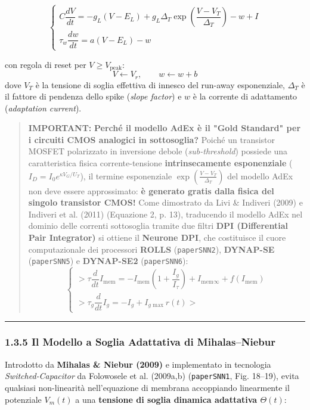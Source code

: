 \documentclass[11pt,a4paper]{article}
\begin{document}
\[
\begin{cases}
C \dfrac{dV}{dt} = -g_L (V - E_L) + g_L \Delta_T \exp\left(\dfrac{V - V_T}{\Delta_T}\right) - w + I \\
\tau_w \dfrac{dw}{dt} = a(V - E_L) - w
\end{cases}
\]

con regola di reset per $V \ge V_{\text{peak}}$:
\[
V \leftarrow V_r, \qquad w \leftarrow w + b
\]
dove $V_T$ è la tensione di soglia effettiva di innesco del run-away esponenziale, $\Delta_T$ è il fattore di pendenza dello spike (\textit{slope factor}) e $w$ è la corrente di adattamento (\textit{adaptation current}).

\begin{quote}
\textbf{IMPORTANT:} \textbf{Perché il modello AdEx è il "Gold Standard" per i circuiti CMOS analogici in sottosoglia?}
Poiché un transistor MOSFET polarizzato in inversione debole (\textit{sub-threshold}) possiede una caratteristica fisica corrente-tensione \textbf{intrinsecamente esponenziale} ($I_D = I_0 e^{\kappa V_G / U_T}$), il termine esponenziale $\exp\left(\frac{V - V_T}{\Delta_T}\right)$ del modello AdEx non deve essere approssimato: \textbf{è generato gratis dalla fisica del singolo transistor CMOS!} Come dimostrato da Livi \& Indiveri (2009) e Indiveri et al. (2011) (Equazione 2, p. 13), traducendo il modello AdEx nel dominio delle correnti sottosoglia tramite due filtri \textbf{DPI (Differential Pair Integrator)} si ottiene il \textbf{Neurone DPI}, che costituisce il cuore computazionale dei processori \textbf{ROLLS} (\texttt{paperSNN2}), \textbf{DYNAP-SE} (\texttt{paperSNN5}) e \textbf{DYNAP-SE2} (\texttt{paperSNN6}):
\[
\begin{cases}
> \tau \dfrac{d}{dt} I_{\text{mem}} = -I_{\text{mem}} \left(1 + \dfrac{I_g}{I_\tau}\right) + I_{\text{mem}\infty} + f(I_{\text{mem}}) \\
> \tau_g \dfrac{d}{dt} I_g = -I_g + I_{g\max} r(t)
> \end{cases}
\]
\end{quote}

\bigskip\hrule\bigskip

\subsubsection{1.3.5 Il Modello a Soglia Adattativa di Mihalas--Niebur}

Introdotto da \textbf{Mihalas \& Niebur (2009)} e implementato in tecnologia \textit{Switched-Capacitor} da Folowosele et al. (2009a,b) (\texttt{paperSNN1}, Fig. 18--19), evita qualsiasi non-linearità nell'equazione di membrana accoppiando linearmente il potenziale $V_m(t)$ a una \textbf{tensione di soglia dinamica adattativa $\Theta(t)$}:
\end{document}
